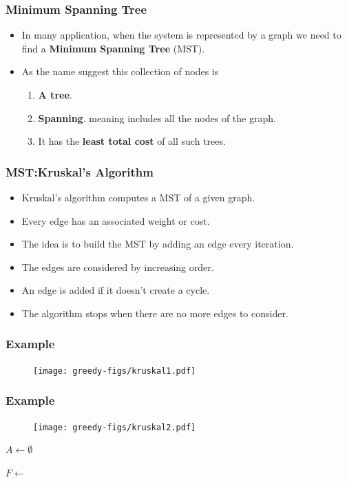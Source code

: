 \documentclass{beamer}
\begin{document}
\begin{frame}
  \frametitle{Minimum Spanning Tree}
  \begin{itemize}
  \item In many application, when the system is represented by a graph
    we need to find a \textbf{Minimum Spanning Tree} (MST).
  \item As the name suggest this collection of nodes is
    \begin{enumerate}
    \item \textbf{A tree}.
    \item\textbf{Spanning}.  meaning includes all the nodes of the graph.
    \item It has the \textbf{least total cost}  of all such trees.
    \end{enumerate}
\end{itemize}
\end{frame}

\begin{frame}
  \frametitle{MST:Kruskal's Algorithm}
  \begin{itemize}
  \item Kruskal's algorithm computes a MST of a given graph.
  \item Every edge has an associated weight or cost.
  \item The idea is to build the MST by adding an edge every
    iteration.
 \item The edges are considered by increasing order.
  \item An edge is added if it doesn't create a cycle.
  \item The algorithm stops when there are no more edges to consider.
  \end{itemize}
\end{frame}
\begin{frame}
  \frametitle{Example}
  \begin{figure}[h]
    \centering
    \texttt{[image: greedy-figs/kruskal1.pdf]}
  \end{figure}
\end{frame}

\begin{frame}
  \frametitle{Example}
  \begin{figure}[h]
    \centering
    \texttt{[image: greedy-figs/kruskal2.pdf]}
  \end{figure}
\end{frame}

\begin{frame}

  \begin{algorithm}[H]

\DontPrintSemicolon
\KwFn\;
$A\gets \emptyset$\;

$F\gets$ \sort\;

\end{algorithm}
\end{frame}
\end{document}
